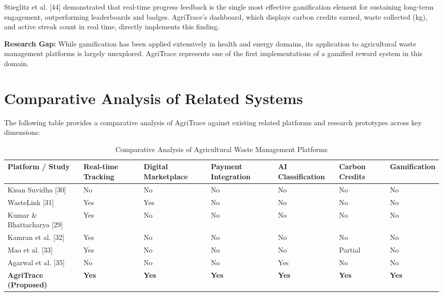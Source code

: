 \documentclass[a4paper,12pt,oneside]{report}
\begin{document}
Stieglitz et al. [44] demonstrated that real-time progress feedback is the single most effective gamification element for sustaining long-term engagement, outperforming leaderboards and badges. AgriTrace's dashboard, which displays carbon credits earned, waste collected (kg), and active streak count in real time, directly implements this finding.

\textbf{Research Gap:} While gamification has been applied extensively in health and energy domains, its application to agricultural waste management platforms is largely unexplored. AgriTrace represents one of the first implementations of a gamified reward system in this domain.

\section{Comparative Analysis of Related Systems}

\noindent The following table provides a comparative analysis of AgriTrace against existing related platforms and research prototypes across key dimensions:

\begin{table}[h!]
\centering
\caption{Comparative Analysis of Agricultural Waste Management Platforms}
\label{tab:lit-comparison}
\begin{tabular}{|p{2.8cm}|p{1.6cm}|p{1.5cm}|p{1.4cm}|p{1.4cm}|p{1.5cm}|p{1.4cm}|}
\hline
\textbf{Platform / Study} & \textbf{Real-time Tracking} & \textbf{Digital Marketplace} & \textbf{Payment Integration} & \textbf{AI Classification} & \textbf{Carbon Credits} & \textbf{Gamification} \\
\hline
Kisan Suvidha [30] & No & No & No & No & No & No \\
\hline
WasteLink [31] & Yes & Yes & No & No & No & No \\
\hline
Kumar \& Bhattacharya [29] & Yes & No & No & No & No & No \\
\hline
Kamran et al. [32] & Yes & No & No & No & No & No \\
\hline
Mao et al. [33] & Yes & No & No & No & Partial & No \\
\hline
Agarwal et al. [35] & No & No & No & Yes & No & No \\
\hline
\textbf{AgriTrace (Proposed)} & \textbf{Yes} & \textbf{Yes} & \textbf{Yes} & \textbf{Yes} & \textbf{Yes} & \textbf{Yes} \\
\hline
\end{tabular}
\end{table}
\end{document}

